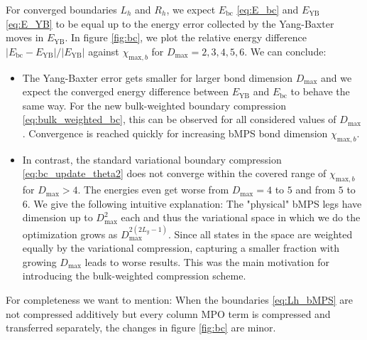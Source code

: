 \noindent For converged boundaries $L_h$ and $R_h$, we expect $E_{\text{bc}}$ \eqref{eq:E_bc} and $E_{\text{YB}}$ \eqref{eq:E_YB} to be equal up to the energy error collected by the Yang-Baxter moves in $E_{\text{YB}}$. In figure \ref{fig:bc}, we plot the relative energy difference $\vert E_{\text{bc}} - E_{\text{YB}} \vert / \vert E_{\text{YB}} \vert$ against $\chi_{\text{max}, b}$ for $D_{\text{max}} = 2, 3, 4, 5, 6$. We can conclude:
\begin{itemize}
	\item The Yang-Baxter error gets smaller for larger bond dimension $D_{\text{max}}$ and we expect the converged energy difference between $E_{\text{YB}}$ and $E_{\text{bc}}$ to behave the same way. For the new bulk-weighted boundary compression \eqref{eq:bulk_weighted_bc}, this can be observed for all considered values of $D_{\text{max}}$. Convergence is reached quickly for increasing bMPS bond dimension $\chi_{\text{max}, b}$.
	\item In contrast, the standard variational boundary compression \eqref{eq:bc_update_theta2} does not converge within the covered range of $\chi_{\text{max}, b}$ for $D_{\text{max}} > 4$. The energies even get worse from $D_{\text{max}} = 4$ to $5$ and from $5$ to $6$. We give the following intuitive explanation: The "physical" bMPS legs have dimension up to $D_{\text{max}}^2$ each and thus the variational space in which we do the optimization grows as $D_{\text{max}}^{2(2L_y-1)}$. Since all states in the space are weighted equally by the variational compression, capturing a smaller fraction with growing $D_{\text{max}}$ leads to worse results. This was the main motivation for introducing the bulk-weighted compression scheme. 
\end{itemize}
For completeness we want to mention: When the boundaries \eqref{eq:Lh_bMPS} are not compressed additively but every column MPO term is compressed and transferred separately, the changes in figure \ref{fig:bc} are minor.


